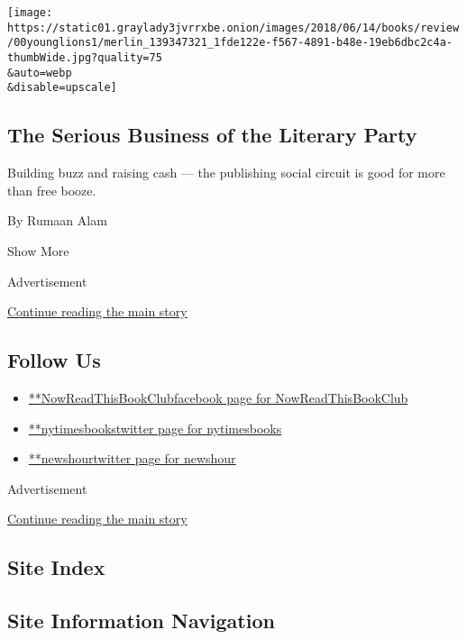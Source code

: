 \begin{enumerate}
  \texttt{[image: https://static01.graylady3jvrrxbe.onion/images/2018/06/14/books/review/00younglions1/merlin\_139347321\_1fde122e-f567-4891-b48e-19eb6dbc2c4a-thumbWide.jpg?quality=75\\\&auto=webp\\\&disable=upscale]}

  \hypertarget{the-serious-business-of-the-literary-party}{%
  \subsection{The Serious Business of the Literary
  Party}\label{the-serious-business-of-the-literary-party}}

  Building buzz and raising cash --- the publishing social circuit is
  good for more than free booze.

  By Rumaan Alam
\end{enumerate}

Show More

Advertisement

\protect\hyperlink{after-mid2}{Continue reading the main story}

\hypertarget{follow-us}{%
\subsection{Follow Us}\label{follow-us}}

\begin{itemize}
\tightlist
\item
  \href{https://www.facebookcorewwwi.onion/NowReadThisBookClub}{**NowReadThisBookClubfacebook
  page for NowReadThisBookClub}
\item
  \href{https://twitter.com/nytimesbooks}{**nytimesbookstwitter page for
  nytimesbooks}
\item
  \href{https://twitter.com/newshour}{**newshourtwitter page for
  newshour}
\end{itemize}

Advertisement

\protect\hyperlink{after-mktg}{Continue reading the main story}

\hypertarget{site-index}{%
\subsection{Site Index}\label{site-index}}

\hypertarget{site-information-navigation}{%
\subsection{Site Information
Navigation}\label{site-information-navigation}}

